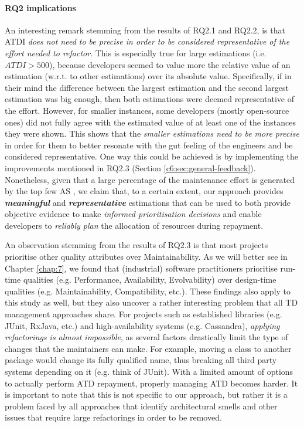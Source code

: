 \paragraph{RQ2 implications}
An interesting remark stemming from the results of RQ2.1 and RQ2.2, is that ATDI \emph{does not need to be precise in order to be considered representative of the effort needed to refactor}.
This is especially true for large estimations (i.e. $ATDI > 500$), because developers seemed to value more the relative value of an estimation (w.r.t. to other estimations) over its absolute value.
Specifically, if in their mind the difference between the largest estimation and the second largest estimation was big enough, then both estimations were deemed representative of the effort. 
However, for smaller instances, some developers (mostly open-source ones) did not fully agree with the estimated value of at least one of the instances they were shown.
This shows that the \emph{smaller estimations need to be more precise} in order for them to better resonate with the gut feeling of the engineers and be considered representative.
One way this could be achieved is by implementing the improvements mentioned in RQ2.3 (Section \ref{c6:sec:general-feedback}).
Nonetheless, given that a large percentage of the maintenance effort is generated by the top few AS \cite{Xiao2016}, we claim that, to a certain extent, our approach provides \emph{\textbf{meaningful}} and \emph{\textbf{representative}} estimations that can be used to both provide objective evidence to make \emph{informed prioritisation decisions} and enable developers to \emph{reliably plan} the allocation of resources during repayment. 

An observation stemming from the results of RQ2.3 is that most projects prioritise other quality attributes over Maintainability.
As we will better see in Chapter \ref{chap:7}, we found that (industrial) software practitioners prioritise run-time qualities (e.g. Performance, Availability, Evolvability) over design-time qualities (e.g. Maintainability, Compatibility, etc.).
These findings also apply to this study as well, but they also uncover a rather interesting problem that all TD management approaches share.
For projects such as established libraries (e.g. JUnit, RxJava, etc.) and high-availability systems (e.g. Cassandra), \emph{applying refactorings is almost impossible}, as several factors drastically limit the type of changes that the maintainers can make.
For example, moving a class to another package would change its fully qualified name, thus breaking all third party systems depending on it (e.g. think of JUnit).
With a limited amount of options to actually perform ATD repayment, properly managing ATD becomes harder.
It is important to note that this is not specific to our approach, but rather it is a problem faced by all approaches that identify architectural smells and other issues that require large refactorings in order to be removed.

